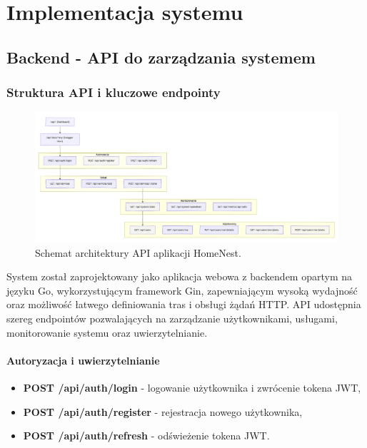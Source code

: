 \chapter{Implementacja systemu}

\section{Backend - API do zarządzania systemem}

\subsection{Struktura API i kluczowe endpointy}
\begin{figure}[H]
  \centering
  \includegraphics[width=1\textwidth]{./chapters/mermeid/schemat api.png}
  \caption{Schemat architektury API aplikacji HomeNest.}
  \label{fig:api_schema}
\end{figure}
System został zaprojektowany jako aplikacja webowa z backendem opartym na języku Go, wykorzystującym framework Gin, zapewniającym wysoką wydajność oraz możliwość łatwego definiowania tras i obsługi żądań HTTP. API udostępnia szereg endpointów pozwalających na zarządzanie użytkownikami, usługami, monitorowanie systemu oraz uwierzytelnianie.

\subsubsection{Autoryzacja i uwierzytelnianie}
\begin{itemize}
    \item \textbf{POST /api/auth/login} - logowanie użytkownika i zwrócenie tokena JWT,
    \item \textbf{POST /api/auth/register} - rejestracja nowego użytkownika,
    \item \textbf{POST /api/auth/refresh} - odświeżenie tokena JWT.
\end{itemize}

